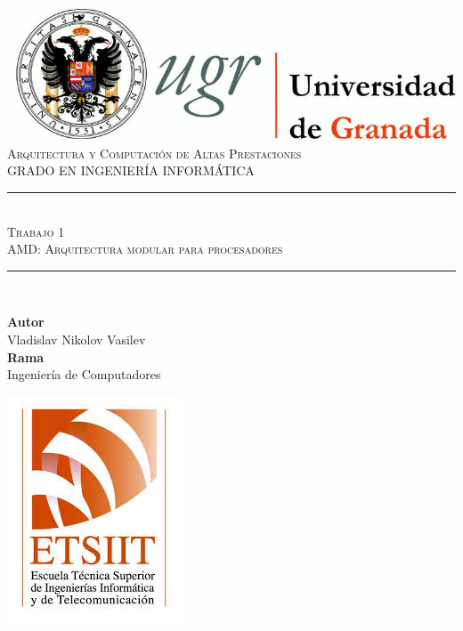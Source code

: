 \documentclass[11pt,a4paper]{article}
\newcommand{\asignatura}{Arquitectura y Computación de Altas Prestaciones}
\newcommand{\autor}{Vladislav Nikolov Vasilev}
\newcommand{\titulo}{Trabajo 1}
\newcommand{\subtitulo}{AMD: Arquitectura modular para procesadores}
\newcommand{\rama}{Ingeniería de Computadores}
\begin{document}

\begin{titlepage}

\begin{minipage}{\textwidth}

\centering

\includegraphics[scale=0.3]{img/logo_ugr.jpg}\\[1cm]

\textsc{\Large \asignatura{}\\[0.2cm]}
\textsc{GRADO EN INGENIERÍA INFORMÁTICA}\\[1cm]

\noindent\rule[-1ex]{\textwidth}{1pt}\\[1.5ex]
\textsc{{\Huge \titulo\\[0.5ex]}}
\textsc{{\Large \subtitulo\\}}
\noindent\rule[-1ex]{\textwidth}{2pt}\\[3.5ex]

\end{minipage}

\vspace{0.7cm}

\begin{minipage}{\textwidth}

\centering

\textbf{Autor}\\ {\autor{}}\\[2.5ex]
\textbf{Rama}\\ {\rama}\\[2.5ex]
\vspace{0.3cm}

\includegraphics[scale=0.3]{img/etsiit.jpeg}


\end{minipage}
\end{titlepage}
\end{document}
